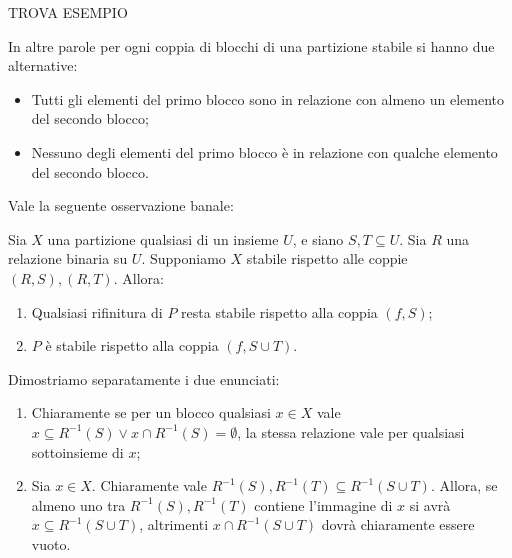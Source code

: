\begin{example}
    \label{exa:set_partition_stable}
    TROVA ESEMPIO
\end{example}
In altre parole per ogni coppia di blocchi di una partizione stabile si hanno due alternative:
\begin{itemize}
    \item Tutti gli elementi del primo blocco sono in relazione con almeno un elemento del secondo blocco;
    \item Nessuno degli elementi del primo blocco è in relazione con qualche elemento del secondo blocco.
\end{itemize}
Vale la seguente osservazione banale:
\begin{observation}
    Sia $X$ una partizione qualsiasi di un insieme $U$, e siano $S,T \subseteq U$. Sia $R$ una relazione binaria su $U$. Supponiamo $X$ stabile rispetto alle coppie $(R,S),(R,T)$. Allora:
    \begin{enumerate}
        \item Qualsiasi rifinitura di $P$ resta stabile rispetto alla coppia $(f,S)$;
        \item $P$ è stabile rispetto alla coppia $(f,S \cup T)$.
    \end{enumerate}
\end{observation}
\begin{proof2}
    Dimostriamo separatamente i due enunciati:
    \begin{enumerate}
        \item Chiaramente se per un blocco qualsiasi $x \in X$ vale $x \subseteq R^{-1}(S) \lor x \cap R^{-1}(S) = \emptyset$, la stessa relazione vale per qualsiasi sottoinsieme di $x$;
        \item Sia $x \in X$. Chiaramente vale $R^{-1}(S),R^{-1}(T) \subseteq R^{-1}(S \cup T)$. Allora, se almeno uno tra $R^{-1}(S),R^{-1}(T)$ contiene l'immagine di $x$ si avrà $x \subseteq R^{-1}(S \cup T)$, altrimenti $x \cap R^{-1}(S \cup T)$ dovrà chiaramente essere vuoto.
    \end{enumerate}
\end{proof2}

